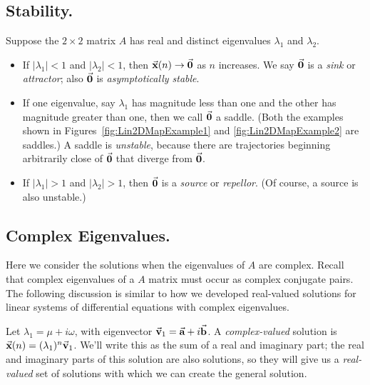 \subsection*{Stability.}
Suppose the $2\times 2$ matrix $A$ has real and distinct eigenvalues
$\lambda_1$ and $\lambda_2$.
\begin{itemize}
\item If $|\lambda_1|<1$ and $|\lambda_2|<1$, then
$\vec{\textbf{x}}(n)\rightarrow\vec{\textbf{0}}$ as $n$ increases.  We say
$\vec{\textbf{0}}$ is a \emph{sink} or \emph{attractor}; also
$\vec{\textbf{0}}$ is \emph{asymptotically stable}.
\item If one eigenvalue, say $\lambda_1$ has magnitude less than
one and the other has magnitude greater than one, then
we call $\vec{\textbf{0}}$ a saddle.  (Both the examples shown in
Figures~\ref{fig:Lin2DMapExample1} and \ref{fig:Lin2DMapExample2}
are saddles.) A saddle is \emph{unstable}, because there
are trajectories beginning arbitrarily close of $\vec{\textbf{0}}$ that
diverge from $\vec{\textbf{0}}$.
\item If $|\lambda_1|>1$ and $|\lambda_2|>1$, then
$\vec{\textbf{0}}$ is a \emph{source} or \emph{repellor}.  (Of course,
a source is also unstable.)
\end{itemize}
%
%
\subsection*{Complex Eigenvalues.}
Here we consider the solutions when the eigenvalues of
$A$ are complex.  Recall that complex eigenvalues of a $A$
matrix must occur as complex conjugate pairs.
The following discussion is similar to how
we developed real-valued solutions for linear systems
of differential equations with complex eigenvalues.
 
Let $\lambda_1=\mu + i\omega$,
with eigenvector $\vec{\textbf{v}}_1 = \vec{\textbf{a}} + i \vec{\textbf{b}}$.
A \emph{complex-valued} solution is
$\vec{\textbf{x}}(n) = (\lambda_1)^n\vec{\textbf{v}}_1$.
We'll write this as the sum of a real and imaginary part;
the real and imaginary parts of this solution are also solutions,
so they will give us a \emph{real-valued} set of solutions
with which we can create the general solution.

